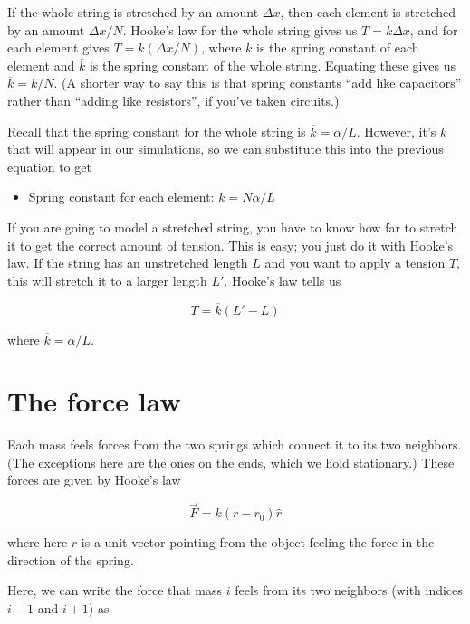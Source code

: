 \documentclass[12ampt]{article}
\begin{document}
     If the whole string is stretched by an amount $\Delta x$, then each element
     is stretched by an amount $\Delta x/N$. Hooke's law for the whole string
     gives us $T=\overline k\Delta x$, and for each element gives $T=k(\Delta x/N)$, 
     where $k$ is the spring constant of each element and $\overline k$ is the spring constant of the whole string. Equating these gives us
     $\overline k=k/N$. (A shorter way to say this is that spring constants ``add like capacitors” rather
     than ``adding like resistors”, if you’ve taken circuits.)

     Recall that the spring constant for the whole string is $\overline k=\alpha/L$. 
     However, it's $k$ that will appear in our simulations, so we can 
     substitute this into the previous equation to get

     \begin{itemize}
       \item{Spring constant for each element: $k=N\alpha/L$}
     \end{itemize}

     If you are going to model a stretched string, you have to know how far to stretch it to get the correct amount of tension. This is easy; you just do it with Hooke’s law.
If the string has an unstretched length $L$ and you want to apply a tension $T$,
this will stretch it to a larger length $L'$. Hooke's law tells us

\begin{equation}
  T = \overline k(L'-L)
\end{equation}

where $\overline k=\alpha/L$.

\section{The force law}

Each mass feels forces from the two springs which connect it to its two
neighbors. (The exceptions here are the ones on the ends, which we hold 
stationary.) These forces are given by Hooke's law

\begin{equation}
  \vec F = k(r-r_0) \hat r
\end{equation}

where here $\hat r$ is a unit vector pointing from the object
feeling the force in the direction of the spring.  

Here, we can write the force that mass $i$ feels from its two neighbors 
(with indices $i-1$ and $i+1$) as
\end{document}
